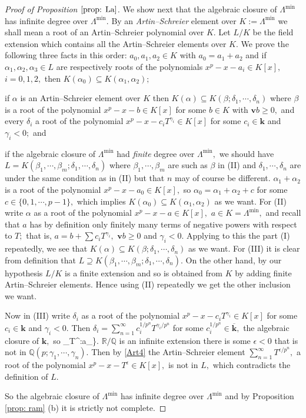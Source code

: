 \documentclass{article}
\theoremstyle{plain}%
\theoremstyle{definition}
\numberwithin{equation}{section}
\numberwithin{figure}{section}
\def\e#1\e{\begin{equation}#1\end{equation}}
\def\iz#1\iz{\begin{itemize}#1\end{itemize}}
\def\eq{\eqref}
\def\l{\label}
\def\ge{\geqslant}
\def\Q{{\mathbin{\mathbb Q}}}
\def\R{{\mathbin{\mathbb R}}}
\def\al{\alpha}
\def\be{\beta}
\def\ga{\gamma}
\def\de{\delta}
\def\ep{\epsilon}
\def\La{\Lambda}
\def\ov{\overline}
\def\iy{\infty}
\def\sb{\subseteq}
\def\k{{\mathbf{k}}}\def\b{{\mathbf{b}}}\def\x{{\mathbf{x}}}
\def\v{{\mathbf{v}}}\def\cl{{\rm cl}}\def\alg{{\rm alg}}\def\geom{{\rm geom}}\def\loc{{\rm loc}}\def\dirlim{\displaystyle\varinjlim}
\begin{document}
\begin{proof}[ Proof of Proposition $\ref{prop: La}$]
We show next that the algebraic closure of $\La^{\min}$ has infinite degree over $\La^{\min}.$
By an {\it Artin--Schreier} element over $K:=\La^{\min}$ we shall mean a root of an Artin--Schreier polynomial over $K.$
Let $L/K$ be the field extension which contains all the Artin--Schreier elements over $K.$
We prove the following three facts in this order: 
\iz
\item[\bf(I)]
if $a_0,a_1,a_2\in K$ with $a_0=a_1+a_2$ and if $\al_1,\al_2,\al_3\in L$ are respectively roots of the  
polynomials $x^p-x-a_i\in K[x],$ $i=0,1,2,$ then 
$K(\al_0)\sb K(\al_1,\al_2);$
\item[\bf(II)]
if $\al$ is an Artin--Schreier element over $K$ then
$ K(\al)\sb K(\be;\de_1,\cdots,\de_n)$
where $\be$ is a root of the polynomial $x^p-x-b\in K[x]$ for some $b\in K$ with $\v b\ge0,$
and every $\de_i$ a root of the polynomial $x^p-x-c_iT^{\ga_i}\in K[x]$ for some $c_i\in\k$ and $\ga_i<0;$ and
\item[\bf(III)]
if the algebraic closure of $\La^{\min}$ had {\it finite} degree over $\La^{\min},$
we should have
$L=K(\be_1,\cdots,\be_m;\de_1,\cdots,\de_n)$
where $\be_1,\cdots,\be_m$ are such as $\be$ in (II) and $\de_1,\cdots,\de_n$ are under the same condition as in (II) but that $n$ may of course be different. 
\iz
For (I) note that $\al_1+\al_2$ is a root of the polynomial $x^p-x-a_0\in K[x],$ so $\al_0=\al_1+\al_2+c$ for some $c\in\{0,1,\cdots,p-1\},$
which implies $K(\al_0)\sb K(\al_1,\al_2)$ as we want.
For (II) write $\al$ as a root of the polynomial $x^p-x-a\in K[x],$ $a\in K=\La^{\min},$ and recall that $a$ has by definition only finitely many terms of negative powers with respect to $T;$ that is, $a=b+\sum c_iT^{\ga_i},$ $\v b\ge0$ and $\ga_i<0.$
Applying to this the part (I) repeatedly, we see that $K(\al)\sb K(\be;\de_1,\cdots,\de_n)$ as we want.
For (III) it is clear from definition that
$L\supseteq K(\be_1,\cdots,\be_m;\de_1,\cdots,\de_n).$
On the other hand, by our hypothesis $L/K$ is a finite extension and so is obtained from $K$ by adding finite Artin--Schreier elements.
Hence using (II) repeatedly we get the other inclusion we want.

Now in (III) write $\de_i$ as a root of the polynomial $x^p-x-c_iT^{\ga_i}\in K[x]$ for some $c_i\in\k$ and $\ga_i<0.$
Then $\de_i=\sum_{n=1}^\iy c_i^{1/p^n}T^{\ga_i/p^n}$ for some $c_i^{1/p^n}\in\ov\k,$ the algebraic closure of $\k,$ so
\e\l{Art4} L\sb\left\{\sum a_\ga T^\ga:a_\ga\in\ov\k\text{ and if $\ga<0$ then $\ga\in \Q(p;\ga_1,\cdots,\ga_n)$}\right\}.\e
But as $\R/\Q$ is an infinite extension there is some $\ep<0$ that is not in $\Q(p;\ga_1,\cdots,\ga_n).$
Then by \eq{Art4} the Artin--Schreier element $\sum_{n=1}^\iy T^{\ep/p^n},$ a root of the polynomial $x^p-x-T^{\ep}\in K[x],$
is not in $L,$ which contradicts the definition of $L.$

So the algebraic closure of $\La^{\min}$ has infinite degree over $\La^{\min}$ and by Proposition \ref{prop: ram} (b) it is strictly not complete.  
\end{proof}
\end{document}

